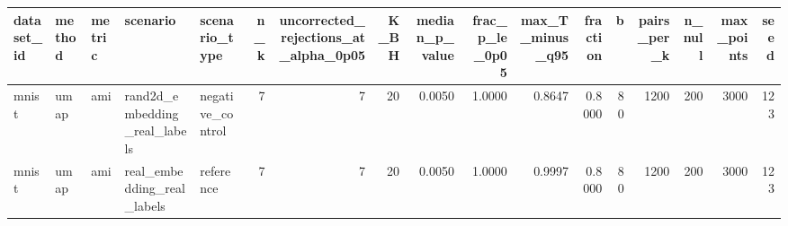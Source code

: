 \begin{tabular}{lllllrrrrrrrrrrrr}
\toprule
dataset_id & method & metric & scenario & scenario_type & n_k & uncorrected_rejections_at_alpha_0p05 & K_BH & median_p_value & frac_p_le_0p05 & max_T_minus_q95 & fraction & b & pairs_per_k & n_null & max_points & seed \\
\midrule
mnist & umap & ami & rand2d_embedding_real_labels & negative_control & 7 & 7 & 20 & 0.0050 & 1.0000 & 0.8647 & 0.8000 & 80 & 1200 & 200 & 3000 & 123 \\
mnist & umap & ami & real_embedding_real_labels & reference & 7 & 7 & 20 & 0.0050 & 1.0000 & 0.9997 & 0.8000 & 80 & 1200 & 200 & 3000 & 123 \\
\bottomrule
\end{tabular}
